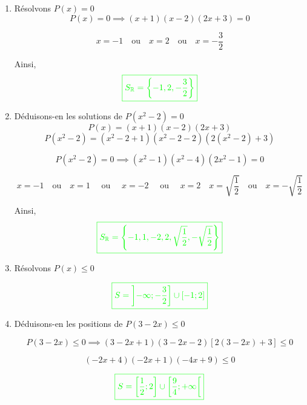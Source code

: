 \documentclass[12pt,a4paper]{article}
\begin{document}
\begin{enumerate}
\item Résolvons \( P(x) = 0 \)
\[
P(x) = 0 \implies (x+1)(x-2)(2x+3) = 0
\]
  
\[
x = -1 \quad \text{ou} \quad x = 2 \quad \text{ou} \quad x = -\frac{3}{2}
\]

Ainsi,  
\[
\textcolor{green}{\boxed{S_{\mathbb{R}} = \left\{ -1, 2, -\frac{3}{2} \right\}}}
\]

\item Déduisons-en les solutions de \( P(x^2 - 2) = 0 \)
 \[ P(x) = (x+1)(x-2)(2x+3) \]
\[
P(x^2 - 2) = (x^2 - 2 + 1)(x^2 - 2 - 2)(2(x^2 - 2) + 3)
\]

\[
P(x^2 - 2) = 0 \implies (x^2 - 1)(x^2-4)(2x^2 - 1) = 0
\]
 
\[
x = -1 \quad \text{ou} \quad x = 1 \quad \text{ ou } \quad x=-2 \quad \text{ ou } \quad x=2\quad x = \sqrt{\frac{1}{2}} \quad \text{ou} \quad x = -\sqrt{\frac{1}{2}}
\]

Ainsi,  
\[
\textcolor{green}{\boxed{S_{\mathbb{R}} = \left\{ -1, 1, -2,2, \sqrt{\frac{1}{2}}, -\sqrt{\frac{1}{2}} \right\}}} 
\]

\item  Résolvons \( P(x) \leq 0 \)

\begin{center}
\end{center}
\[
\textcolor{green}{\boxed{S = \left] -\infty ; -\frac{3}{2}\right] \cup \left[-1;2\right] }} 
\]
\item Déduisons-en les positions de \( P(3-2x) \leq 0 \)

\[
P(3-2x) \leq 0 \implies 
\left( 3 - 2x + 1 \right)\left( 3 - 2x - 2 \right)\left[ 2\left( 3 - 2x \right) + 3 \right] \leq 0
\]

\[
\left( -2x + 4 \right)\left( -2x + 1 \right)\left( -4x + 9 \right) \leq 0
\]
\begin{center}
\end{center}
\[
\textcolor{green}{\boxed{S = \left[ \frac{1}{2} ; 2\right] \cup \left[ \frac{9}{4};+\infty\right[ }} 
\]
\end{enumerate}
\end{document}
